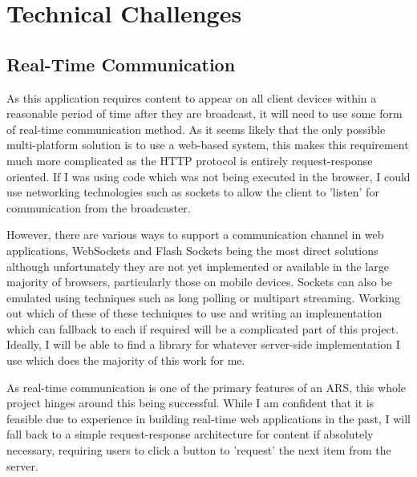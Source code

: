 \documentclass[a4papert,11pt,notitlepage]{ltxdoc}
\begin{document}
\section{Technical Challenges}
\subsection{Real-Time Communication}
As this application requires content to appear on all client devices within a reasonable period of time after they are broadcast, it will need to use some form of real-time communication method. As it seems likely that the only possible multi-platform solution is to use a web-based system, this makes this requirement much more complicated as the HTTP protocol is entirely request-response oriented. If I was using code which was not being executed in the browser, I could use networking technologies such as sockets to allow the client to 'listen' for communication from the broadcaster.

However, there are various ways to support a  communication channel in web applications, WebSockets and Flash Sockets being the most direct solutions although unfortunately they are not yet implemented or available in the large majority of browsers, particularly those on mobile devices. Sockets can also be emulated using techniques such as long polling or multipart streaming. Working out which of these of these techniques to use and writing an implementation which can fallback to each if required will be a complicated part of this project. Ideally, I will be able to find a library for whatever server-side implementation I use which does the majority of this work for me.

As real-time communication is one of the primary features of an ARS, this whole project hinges around this being successful. While I am confident that it is feasible due to experience in building real-time web applications in the past, I will fall back to a simple request-response architecture for content if absolutely necessary, requiring users to click a button to 'request' the next item from the server.


\end{document}
